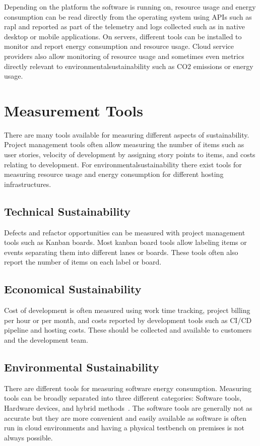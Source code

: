 Depending on the platform the software is running on, resource usage and energy consumption can be read directly from the operating system using APIs such as \gls{rapl} and reported as part of the telemetry and logs collected such as in native desktop or mobile applications. On servers, different tools can be installed to monitor and report energy consumption and resource usage. Cloud service providers also allow monitoring of resource usage and sometimes even metrics directly relevant to \gls{environmentalsustainability} such as CO2 emissions or energy usage.

\section{Measurement Tools}\label{tools}
There are many tools available for measuring different aspects of sustainability. Project management tools often allow measuring the number of items such as user stories, velocity of development by assigning story points to items, and costs relating to development. For \gls{environmentalsustainability} there exist tools for measuring resource usage and energy consumption for different hosting infrastructures.

\subsection{Technical Sustainability}
Defects and refactor opportunities can be measured with project management tools such as Kanban boards. Most kanban board tools allow labeling items or events separating them into different lanes or boards. These tools often also report the number of items on each label or board.

\subsection{Economical Sustainability}
Cost of development is often measured using work time tracking, project billing per hour or per month, and costs reported by development tools such as CI/CD pipeline and hosting costs. These should be collected and available to customers and the development team.

\subsection{Environmental Sustainability}
There are different tools for measuring software energy consumption. Measuring tools can be broadly separated into three different categories: Software tools, Hardware devices, and hybrid methods~\cite{8716456}. The software tools are generally not as accurate but they are more convenient and easily available as software is often run in cloud environments and having a physical testbench on premises is not always possible.


